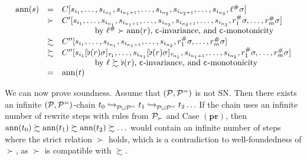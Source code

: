 \begin{myproof}
\begin{itemize}
          {\small\[
            \begin{array}{lcl}
              \mathrm{ann}(s) & = & C[s_{i_1}, \ldots, s_{i_{n_1}},s_{i_{n_1 + 1}}, \ldots,
                s_{i_{n_2}},s_{i_{n_2 + 1}}, \ldots, s_{i_{n_3}},\ell^\#\sigma]\\
              & \succ & C'[s_{i_1}, \ldots, s_{i_{n_1}},s_{i_{n_1 + 1}}, \ldots,
                s_{i_{n_2}},s_{i_{n_2 + 1}}, \ldots, s_{i_{n_3}},r_1^\#\sigma, \ldots,
                r_m^\#\sigma]\\
              &&\qquad\qquad \text{by $\ell^\# \succ \mathrm{ann}(r)$, $\mathsf{c}_{}$-invariance, and $\mathsf{c}_{}$-monotonicity}\\
              & \succsim & C''[s_{i_1}, \ldots, s_{i_{n_1}},s_{i_{n_1 + 1}}, \ldots,
                s_{i_{n_2}},r_1^\#\sigma, \ldots,
                r_m^\#\sigma]\\
               & \succsim & C''[s_{i_1}[\flat(r) \sigma]_{\tau_{1}}, \ldots, s_{i_{n_1}}[\flat(r) \sigma]_{\tau_{n_1}},s_{i_{n_1 + 1}}, \ldots,
                s_{i_{n_2}},r_1^\#\sigma, \ldots,
                r_m^\#\sigma]\\
              &&\qquad\qquad \text{by $\ell \succsim \flat(r)$, $\mathsf{c}_{}$-invariance, and
                $\mathsf{c}_{}$-monotonicity}\\
                            & = & \mathrm{ann}(t)\!    
            \end{array}
        \]}
    \end{itemize}

    We can now prove soundness.
    Assume that $(\mathcal{P}, \mathcal{P}^{=})$ is not SN.
    Then there exists an infinite $(\mathcal{P}, \mathcal{P}^{=})$-chain $t_0 \mathrel{ \xhookrightarrow{{}_{\scriptstyle }} \!\!{}^{}_{\mathcal{P} \cup \mathcal{P}^{=}} } t_1 \mathrel{ \xhookrightarrow{{}_{\scriptstyle }} \!\!{}^{}_{\mathcal{P} \cup \mathcal{P}^{=}} } t_2 \ldots$
    If the chain uses an infinite number of rewrite steps with rules from $\mathcal{P}_{\succ}$ and Case $(\mathbf{pr})$, 
    then $\mathrm{ann}(t_0) \succsim \mathrm{ann}(t_1) \succsim \mathrm{ann}(t_2) \succsim \ldots$
    would contain an infinite number of steps where the
    strict relation $\succ$ holds, which is a contradiction to well-foundedness of $\succ$, 
    as $\succ$ is compatible with $\succsim$.


\end{myproof}
